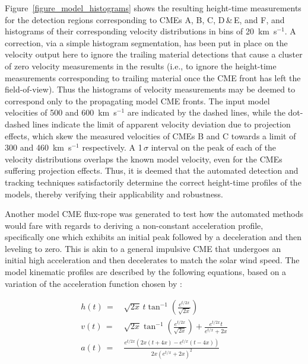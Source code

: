 \documentclass[preprint2]{aastex}
\begin{document}
Figure~\ref{figure_model_histograms} shows the resulting height-time measurements for the detection regions corresponding to CMEs A, B, C, D\,\&\,E, and F, and histograms of their corresponding velocity distributions in bins of 20~km~s$^{-1}$. A correction, via a simple histogram segmentation, has been put in place on the velocity output here to ignore the trailing material detections that cause a cluster of zero velocity measurements in the results (i.e., to ignore the height-time measurements corresponding to trailing material once the CME front has left the field-of-view). Thus the histograms of velocity measurements may be deemed to correspond only to the propagating model CME fronts. The input model velocities of 500 and 600~km~s$^{-1}$ are indicated by the dashed lines, while the dot-dashed lines indicate the limit of apparent velocity deviation due to projection effects, which skew the measured velocities of CMEs B and C towards a limit of 300 and 460~km~s$^{-1}$ respectively. A 1\,$\sigma$ interval on the peak of each of the velocity distributions overlaps the known model velocity, even for the CMEs suffering projection effects. Thus, it is deemed that the automated detection and tracking techniques satisfactorily determine the correct height-time profiles of the models, thereby verifying their applicability and robustness.

Another model CME flux-rope was generated to test how the automated methods would fare with regards to deriving a non-constant acceleration profile, specifically one which exhibits an initial peak followed by a deceleration and then leveling to zero. This is akin to a general impulsive CME that undergoes an initial high acceleration and then decelerates to match the solar wind speed. The model kinematic profiles are described by the following equations, based on a variation of the acceleration function chosen by \citet{2003ApJ...588L..53G}:

\begin{eqnarray}
h(t)\,=&\,\sqrt{2x}\,t\tan^{-1}\left(\frac{e^{t/2x}}{\sqrt{2x}}\right) \\
v(t)\,=&\,\sqrt{2x}\tan^{-1}\left(\frac{e^{t/2x}}{\sqrt{2x}}\right)+\frac{e^{t/2x}t}{e^{t/x}+2x} \\
a(t)\,=&\,\frac{e^{t/2x}\left(2x\left(t+4x\right)-e^{t/x}\left(t-4x\right)\right)}{2x\left(e^{t/x}+2x\right)^2}
\end{eqnarray}
\end{document}
